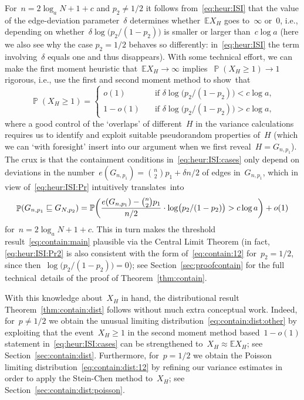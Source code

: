 \documentclass{article}
\renewcommand{\Pr}{\mathbb{P}}
\newcommand{\E}{\mathbb{E}}
\newcommand{\isub}{\sqsubseteq}
\DeclareMathOperator{\pr}{\mathbb{P}}
\newcommand\bigpar[1]{\bigl(#1\bigr)}
\newcommand\biggpar[1]{\biggl(#1\biggr)}
\newcommand{\refT}[1]{Theorem~\ref{#1}}
\begin{document}
For~$n=2\log_a N+1+c$ and $p_2 \neq 1/2$ it follows from~\eqref{eq:heur:ISI} that 
the value of the edge-deviation parameter~$\delta$ determines whether~$\E X_H$ 
goes to~$\infty$ or~$0$, 
i.e., depending on whether~${\delta \log\bigpar{p_2/(1-p_2)}}$ is smaller or larger than~${c \log a}$ (here we also see why the case $p_2=1/2$ behaves so differently: in~\eqref{eq:heur:ISI} the term involving~$\delta$ equals one and thus disappears). 
With some technical effort, we can make the first moment 
heuristic that~$\E X_H\to\infty$ implies~$\pr(X_H \ge 1) \to 1$ rigorous, 
i.e., use the first and second moment method to show~that 
\begin{equation}\label{eq:heur:ISI:cases}
\pr(X_H \ge 1) = \begin{cases} o(1) \quad & \text{if~$\delta \log\bigpar{p_2/(1-p_2)}< c \log a$,}\\ 
1-o(1) \quad & \text{if~$\delta \log\bigpar{p_2/(1-p_2)}>c \log a$,}\end{cases} 
\end{equation}
where a good control of the `overlaps' of different~$H$ in the variance calculations requires us to identify and exploit suitable pseudorandom properties of~$H$ 
(which we can `with foresight' insert into our argument when we first reveal~${H=G_{n,p_1}}$). 
The crux is that the containment conditions in~\eqref{eq:heur:ISI:cases} only depend on deviations in the number~$e(G_{n,p_1})={\binom{n}{2}p_1+\delta n/2}$ of edges in~$G_{n,p_1}$, 
which in view of~\eqref{eq:heur:ISI:Pr} intuitively translates~into 
\begin{equation}\label{eq:heur:ISI:Pr2}
\pr(G_{n,p_1} \isub G_{N,p_2}) =
  \Pr\biggpar{\frac{e(G_{n,p_1})-\tbinom{n}{2}p_1}{n/2} \cdot \log\bigpar{p_2/(1-p_2)} > c \log a} + o(1)
\end{equation}
for~$n=2\log_a N+1+c$. 
This in turn makes the threshold result~\eqref{eq:contain:main} plausible via the Central Limit Theorem (in fact, \eqref{eq:heur:ISI:Pr2} is also consistent with the form of~\eqref{eq:contain:12} for~$p_2=1/2$, since then~${\log\bigpar{p_2/(1-p_2)}=0}$); 
see Section~\ref{sec:proofcontain} for the full technical~details of the proof of \refT{thm:contain}.


With this knowledge about~$X_H$ in hand, the distributional result Theorem~\ref{thm:contain:dist} follows without much extra conceptual work. 
Indeed, for~$p \neq 1/2$ we obtain the unusual limiting distribution~\eqref{eq:contain:dist:other} 
by exploiting that the event~$X_H \ge 1$ in the second moment method based~$1-o(1)$ statement in~\eqref{eq:heur:ISI:cases} can be strengthened to~$X_H \approx \E X_H$; see Section~\ref{sec:contain:dist}. 
Furthermore, for~$p=1/2$ we obtain the Poisson limiting distribution~\eqref{eq:contain:dist:12} by refining our variance estimates in order to apply the Stein-Chen method to~$X_H$; see Section~\ref{sec:contain:dist:poisson}. 
\end{document}
